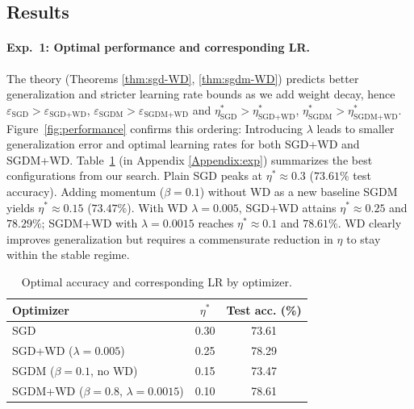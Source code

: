 \subsection{Results}

\paragraph{Exp.\ 1: Optimal performance and corresponding LR.}
The theory (Theorems \ref{thm:sgd-WD}, \ref{thm:sgdm-WD}) predicts better generalization and stricter learning rate bounds as we add weight decay, hence $\varepsilon_{\text{SGD}} > \varepsilon_{\text{SGD+WD}}$, $\varepsilon_{\text{SGDM}} > \varepsilon_{\text{SGDM+WD}}$ and $\eta^*_{\text{SGD}} > \eta^*_{\text{SGD+WD}}$, $\eta^*_{\text{SGDM}} > \eta^*_{\text{SGDM+WD}}$. Figure~\ref{fig:performance} confirms this ordering: Introducing $\lambda$ leads to smaller generalization error and optimal learning rates for both SGD+WD and SGDM+WD. Table~\ref{tab:exp1} (in Appendix \ref{Appendix:exp}) summarizes the best configurations from our search. Plain SGD peaks at $\eta^* \approx 0.3$ ($73.61\%$ test accuracy). 
Adding momentum ($\beta{=}0.1$) without WD as a new baseline SGDM yields $\eta^* \approx 0.15$ ($73.47\%$). With WD $\lambda{=}0.005$, SGD+WD attains $\eta^* \approx 0.25$ and $78.29\%$; SGDM+WD with $\lambda{=}0.0015$ reaches $\eta^* \approx 0.1$ and $78.61\%$. WD clearly improves generalization but requires a commensurate reduction in $\eta$ to stay within the stable regime.

\vspace{-0.5em} 
\begin{table}[h]
\caption{Optimal accuracy and corresponding LR by optimizer.}
\label{tab:exp1}
\centering
\small
\begin{tabular}{lcc}
\toprule
Optimizer & $\eta^*$ & Test acc. (\%) \\
\midrule
SGD & 0.30 & 73.61 \\
SGD+WD ($\lambda{=}0.005$) & 0.25 & 78.29 \\
SGDM ($\beta{=}0.1$, no WD) & 0.15 & 73.47 \\
SGDM+WD ($\beta{=}0.8$, $\lambda{=}0.0015$) & 0.10 & 78.61 \\
\bottomrule
\end{tabular}
\vspace{-0.5em}
\end{table}



